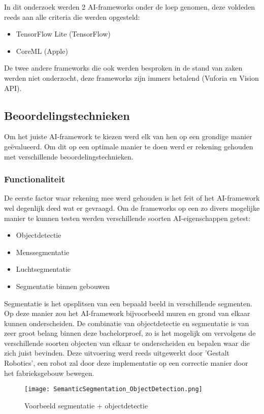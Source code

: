 In dit onderzoek werden 2 AI-frameworks onder de loep genomen, deze voldeden reeds aan alle criteria die werden opgesteld:

\begin{itemize}
	\item TensorFlow Lite (TensorFlow)
	\item CoreML (Apple)
\end{itemize}

De twee andere frameworks die ook werden besproken in de stand van zaken werden niet onderzocht, deze frameworks zijn immers betalend (Vuforia en Vision API). 

\subsection{Beoordelingstechnieken}
Om het juiste AI-framework te kiezen werd elk van hen op een grondige manier geëvalueerd. Om dit op een optimale manier te doen werd er rekening gehouden met verschillende beoordelingstechnieken.

\subsubsection{Functionaliteit}
De eerste factor waar rekening mee werd gehouden is het feit of het AI-framework wel degenlijk deed wat er gevraagd. Om de frameworks op een zo divers mogelijke manier te kunnen testen werden verschillende soorten AI-eigenschappen getest:
\begin{itemize}
	\item Objectdetectie
	\item Menssegmentatie
	\item Luchtsegmentatie 
	\item Segmentatie binnen gebouwen
\end{itemize}
Segmentatie is het opsplitsen van een bepaald beeld in verschillende segmenten. Op deze manier zou het AI-framework bijvoorbeeld muren en grond van elkaar kunnen onderscheiden. De combinatie van objectdetectie en segmentatie is van zeer groot belang binnen deze bachelorproef, zo is het mogelijk om vervolgens de verschillende soorten objecten van elkaar te onderscheiden en bepalen waar die zich juist bevinden. Deze uitvoering werd reeds uitgewerkt door 'Gestalt Robotics', een robot zal door deze implementatie op een correctie manier door het fabrieksgebouw bewegen.

\begin{figure}[H]
	\centering
	\texttt{[image: SemanticSegmentation\_ObjectDetection.png]}
	\caption{Voorbeeld segmentatie + objectdetectie \autocite{Gestalt2019}}
\end{figure}

